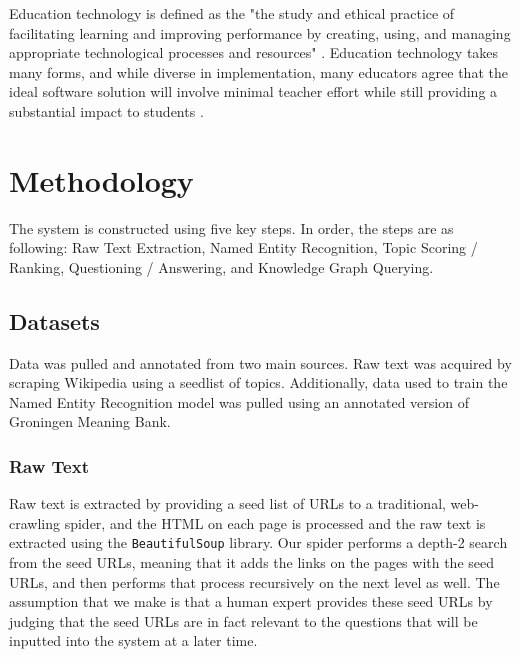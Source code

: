 \documentclass[11pt,a4paper]{article}
\begin{document}
Education technology is defined as the "the study and ethical practice of facilitating learning and improving performance by creating, using, and managing appropriate technological processes and resources" \cite{hlynka_jacobsen}. Education technology takes many forms, and while diverse in implementation, many educators agree that the ideal software solution will involve minimal teacher effort while still providing a substantial impact to students \cite{norris_soloway02/12/18}.

\section{Methodology}
The system is constructed using five key steps. In order, the steps are as following: Raw Text Extraction, Named Entity Recognition, Topic Scoring / Ranking, Questioning / Answering, and Knowledge Graph Querying. 

\subsection{Datasets}
Data was pulled and annotated from two main sources. Raw text was acquired by scraping Wikipedia using a seedlist of topics. Additionally, data used to train the Named Entity Recognition model was pulled using an annotated version of Groningen Meaning Bank. 

\subsubsection{Raw Text}\label{data_raw_text}
Raw text is extracted by providing a seed list of URLs to a traditional, web-crawling spider, and the HTML on each page is processed and the raw text is extracted using the \texttt{BeautifulSoup} library. Our spider performs a depth-2 search from the seed URLs, meaning that it adds the links on the pages with the seed URLs, and then performs that process recursively on the next level as well. The assumption that we make is that a human expert provides these seed URLs by judging that the seed URLs are in fact relevant to the questions that will be inputted into the system at a later time.
\end{document}
